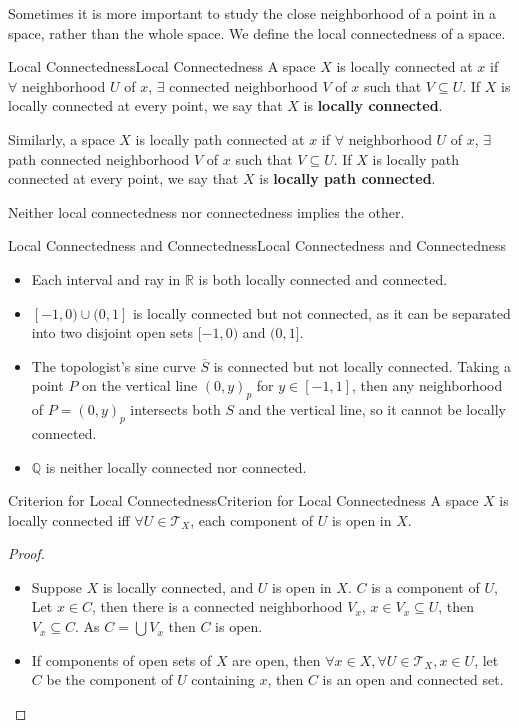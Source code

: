 \documentclass[../main.tex]{subfiles}
\begin{document}
Sometimes it is more important to study the close neighborhood of a point in a space, rather than the whole space. We define the local connectedness of a space.

\begin{definition}{Local Connectedness}{Local Connectedness}
	A space $X$ is locally connected at $x$ if $\forall $ neighborhood $U$ of $x$, $\exists $ connected neighborhood $V$ of $x$ such that $V \subseteq U$. If $X$ is locally connected at every point, we say that $X$ is \textbf{locally connected}.

	Similarly, a space $X$ is locally path connected at $x$ if $\forall $ neighborhood $U$ of $x$, $\exists $ path connected neighborhood $V$ of $x$ such that $V \subseteq U$. If $X$ is locally path connected at every point, we say that $X$ is \textbf{locally path connected}.
\end{definition}

Neither local connectedness nor connectedness implies the other.

\begin{example}{Local Connectedness and Connectedness}{Local Connectedness and Connectedness}
\begin{itemize}
\item Each interval and ray in $\mathbb{R}$ is both locally connected and connected.
\item $[-1,0)\cup (0,1]$ is locally connected but not connected, as it can be separated into two disjoint open sets $[-1,0)$ and $(0,1]$.
\item The topologist's sine curve $\overline{S}$ is connected but not locally connected. Taking a point $P$ on the vertical line $(0,y)_p$ for $y\in [-1,1]$, then any neighborhood of $P = (0,y)_p$ intersects both $S$ and the vertical line, so it cannot be locally connected.
\item $\mathbb{Q}$ is neither locally connected nor connected.
\end{itemize}
\end{example}

\begin{theorem}{Criterion for Local Connectedness}{Criterion for Local Connectedness}
A space $X$ is locally connected iff $\forall U\in \mathcal{T}_X$, each component of $U$ is open in $X$.
\end{theorem}
\begin{proof}
\begin{itemize}
\item Suppose $X$ is locally connected, and $U$ is open in $X$. $C$ is a component of $U$, Let $x\in C$, then there is a connected neighborhood $V_x$, $x\in V_x \subseteq U$, then $V_x \subseteq C$. As $C = \bigcup V_x$ then $C$ is open.
\item If components of open sets of $X$ are open, then $\forall x\in X,\forall U\in \mathcal{T}_X, x\in U$, let $C$ be the component of $U$ containing $x$, then $C$ is an open and connected set.
\end{itemize}
\end{proof}
\end{document}
